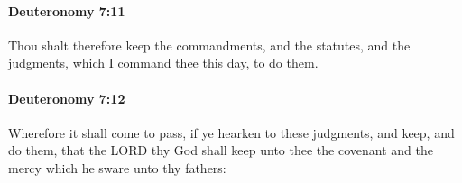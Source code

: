 		\paragraph{Deuteronomy 7:11} %
			\label{DEUTERONOMY-7-11}

			Thou shalt therefore keep the commandments, and the statutes, and the judgments, which I command thee this day, to do them.


		\paragraph{Deuteronomy 7:12} %
			\label{DEUTERONOMY-7-12}

			Wherefore it shall come to pass, if ye hearken to these judgments, and keep, and do them, that the LORD thy God shall keep unto thee the covenant and the mercy which he sware unto thy fathers:


